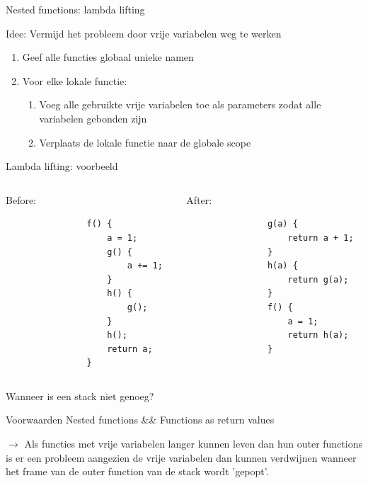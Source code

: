 \documentclass{beamer}
\begin{document}
\begin{frame}{Nested functions: lambda lifting}
	\begin{block}{Idee:}
		Vermijd het probleem door vrije variabelen weg te werken
	\end{block}

	\begin{enumerate}
		\item Geef alle functies globaal unieke namen
		\item Voor elke lokale functie:
		\begin{enumerate}
			\item Voeg alle gebruikte vrije variabelen toe als parameters zodat alle variabelen gebonden zijn
			\item Verplaats de lokale functie naar de globale scope
		\end{enumerate}
	\end{enumerate}

\end{frame}

\begin{frame}[fragile]{Lambda lifting: voorbeeld}
	\begin{columns}[t]
		\begin{column}{.5\textwidth}
			Before:
			\begin{verbatim}
				f() {
				    a = 1;
				    g() {
				        a += 1;
				    }
				    h() {
				        g();
				    }
				    h();
				    return a;
				}
			\end{verbatim}
		\end{column}
		\begin{column}{.5\textwidth}
			After:
			\begin{verbatim}
				g(a) {
				    return a + 1;
				}
				h(a) {
				    return g(a);
				}
				f() {
				    a = 1;
				    return h(a);
				}
			\end{verbatim}
		\end{column}
	\end{columns}
\end{frame}

\begin{frame}{Wanneer is een stack niet genoeg?}
	\begin{block}{Voorwaarden}
	    Nested functions \&\& Functions as return values
	\end{block}
	$\rightarrow$ Als functies met vrije variabelen langer kunnen leven dan hun outer functions is er een probleem aangezien de vrije variabelen dan kunnen verdwijnen wanneer het frame van de outer function van de stack wordt 'gepopt'.
\end{frame}
\end{document}
